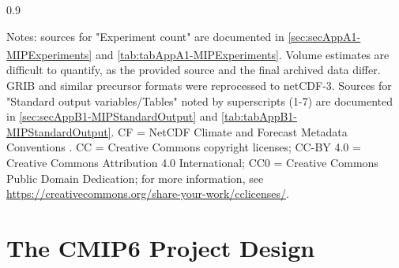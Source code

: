 \documentclass[gmd, preprint]{copernicus}
\begin{document}
\begin{table}[htp]
{\begin{tabularx}{0.9\textwidth}
\end{tabularx}
} %
\label{tab:tab1-MIPsThroughTime}
\footnotesize{Notes: sources for "Experiment count" are documented in \autoref{sec:secAppA1-MIPExperiments} and \autoref{tab:tabAppA1-MIPExperiments}. {}\textsuperscript{\textdagger}Volume estimates are difficult to quantify, as the provided source and the final archived data differ. GRIB and similar precursor formats were reprocessed to netCDF-3. Sources for "Standard output variables/Tables" noted by superscripts (1-7) are documented in \autoref{sec:secAppB1-MIPStandardOutput} and \autoref{tab:tabAppB1-MIPStandardOutput}. CF = NetCDF Climate and Forecast Metadata Conventions \citep{eaton_netcdf_2024}. CC = Creative Commons copyright licenses; CC-BY 4.0 = Creative Commons Attribution 4.0 International; CC0 = Creative Commons Public Domain Dedication; for more information, see \url{https://creativecommons.org/share-your-work/cclicenses/}.}
\end{table}

\section{The CMIP6 Project Design}
\label{sec:cmip6ProjectDesign}
\end{document}
